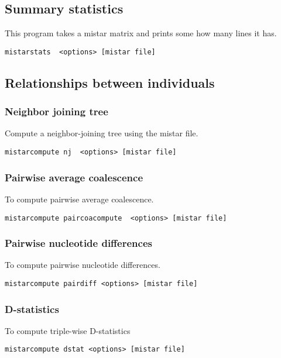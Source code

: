 \documentclass[a4paper]{article}
\begin{document}
\subsection{Summary statistics}

This program takes a mistar matrix and prints some how many lines it has.
\begin{verbatim}
mistarstats  <options> [mistar file]
\end{verbatim}


\subsection{Relationships between individuals}


\subsubsection{Neighbor joining tree}

Compute a neighbor-joining tree using the mistar file.

\begin{verbatim}
mistarcompute nj  <options> [mistar file]
\end{verbatim}

\subsubsection{Pairwise average coalescence}

To compute pairwise average coalescence.
\begin{verbatim}
mistarcompute paircoacompute  <options> [mistar file]
\end{verbatim}

\subsubsection{Pairwise nucleotide differences}

To compute pairwise nucleotide differences.
\begin{verbatim}
mistarcompute pairdiff <options> [mistar file]
\end{verbatim}

\subsubsection{D-statistics}
To compute triple-wise D-statistics
\begin{verbatim}
mistarcompute dstat <options> [mistar file]
\end{verbatim}
\end{document}

